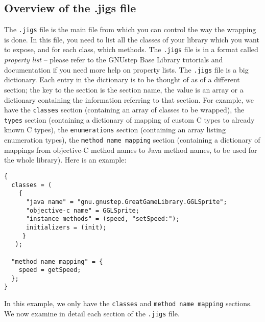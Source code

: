 \subsection{Overview of the .jigs file}
The \texttt{.jigs} file is the main file from which you can control
the way the wrapping is done.  In this file, you need to list all the
classes of your library which you want to expose, and for each class,
which methods.  The \texttt{.jigs} file is in a format called 
\emph{property list} -- please refer to the GNUstep Base Library tutorials 
and documentation if you need more help on property lists.  The
\texttt{.jigs} file is a big dictionary.  Each entry in the dictionary 
is to be thought of as of a different section; the key to the section
is the section name, the value is an array or a dictionary containing
the information referring to that section.  For example, we have the
\texttt{classes} section (containing an array of classes to be wrapped), the
\texttt{types} section (containing a dictionary of mapping of custom C 
types to already known C types), the \texttt{enumerations} section
(containing an array listing enumeration types), the \texttt{method
name mapping} section (containing a dictionary of mappings from
objective-C method names to Java method names, to be used for the
whole library).  Here is an example:
\begin{verbatim}
{
  classes = (
    {
      "java name" = "gnu.gnustep.GreatGameLibrary.GGLSprite";
      "objective-c name" = GGLSprite;
      "instance methods" = (speed, "setSpeed:");
      initializers = (init);
     }
   );
  
  "method name mapping" = {
    speed = getSpeed;
  };
}
\end{verbatim}

In this example, we only have the \texttt{classes} and \texttt{method
name mapping} sections.  We now examine in detail each section of the
\texttt{.jigs} file.

